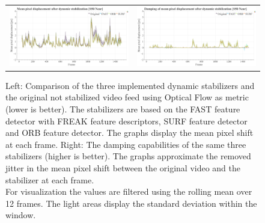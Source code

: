 \begin{figure}[!ht]
\begin{tabular}{cc}
      \includegraphics[width=0.475\linewidth]{diagrams/optical_flow/s50_s_near_image_raw.mp4.csv/compare_of_mean_pixel_displacement/window_size_12.html.png}    &   
      \includegraphics[width=0.475\linewidth]{diagrams/optical_flow/s50_s_near_image_raw.mp4.csv/deltas_of_mean_pixel_displacement/window_size_12.html.png}   \\ 
    \end{tabular}
    \caption{
        Left: 
        Comparison of the three implemented dynamic stabilizers and the original not stabilized video feed using Optical Flow as metric (lower is better).
        The stabilizers are based on the 
        FAST \cite{Ghahremani_2021,opencv_library} feature detector with FREAK \cite{alahi6247715,opencv_library} feature descriptors,
        SURF \cite{bay10.1007/11744023_32,opencv_library} feature detector and
        ORB \cite{rublee6126544, opencv_library} feature detector.
        The graphs display the mean pixel shift at each frame. 
        Right: 
        The damping capabilities of the same three stabilizers (higher is better). 
        The graphs approximate the removed jitter in the mean pixel shift between the original video and the stabilizer at each frame.\\
        For visualization the values are filtered using the rolling mean over 12 frames. 
        The light areas display the standard deviation within the window.
    }
    \label{fig:dynamic_stabilization_appendix}
    \end{figure}

    



